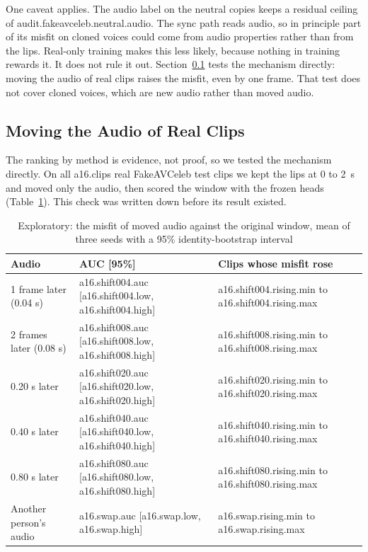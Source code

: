 One caveat applies. The audio label on the neutral copies keeps a residual
ceiling of {{audit.fakeavceleb.neutral.audio}}. The sync path reads audio, so
in principle part of its misfit on cloned voices could come from audio
properties rather than from the lips. Real-only training makes this less
likely, because nothing in training rewards it. It does not rule it out.
Section~\ref{sec:r-moved} tests the mechanism directly: moving the audio of real clips raises the misfit, even by one frame. That test does not cover cloned voices, which are new audio rather than moved audio.

\subsection{Moving the Audio of Real Clips}
\label{sec:r-moved}

The ranking by method is evidence, not proof, so we tested the mechanism
directly. On all {{a16.clips}} real FakeAVCeleb test clips we kept the lips at
0 to 2~s and moved only the audio, then scored the window with the frozen
heads (Table~\ref{tab:a16}). This check was written down before its result
existed.

\begin{table}[htbp]
    \centering
    \caption{Exploratory: the misfit of moved audio against the original window, mean of three seeds with a 95\% identity-bootstrap interval}
    \label{tab:a16}
    \begin{tabular}{lll}
        \toprule
        \textbf{Audio} & \textbf{AUC [95\%]} & \textbf{Clips whose misfit rose} \\
        \midrule
        1 frame later (0.04 s) & {{a16.shift004.auc}} [{{a16.shift004.low}}, {{a16.shift004.high}}] & {{a16.shift004.rising.min}} to {{a16.shift004.rising.max}} \\
        2 frames later (0.08 s) & {{a16.shift008.auc}} [{{a16.shift008.low}}, {{a16.shift008.high}}] & {{a16.shift008.rising.min}} to {{a16.shift008.rising.max}} \\
        0.20 s later & {{a16.shift020.auc}} [{{a16.shift020.low}}, {{a16.shift020.high}}] & {{a16.shift020.rising.min}} to {{a16.shift020.rising.max}} \\
        0.40 s later & {{a16.shift040.auc}} [{{a16.shift040.low}}, {{a16.shift040.high}}] & {{a16.shift040.rising.min}} to {{a16.shift040.rising.max}} \\
        0.80 s later & {{a16.shift080.auc}} [{{a16.shift080.low}}, {{a16.shift080.high}}] & {{a16.shift080.rising.min}} to {{a16.shift080.rising.max}} \\
        Another person's audio & {{a16.swap.auc}} [{{a16.swap.low}}, {{a16.swap.high}}] & {{a16.swap.rising.min}} to {{a16.swap.rising.max}} \\
        \bottomrule
    \end{tabular}
\end{table}

